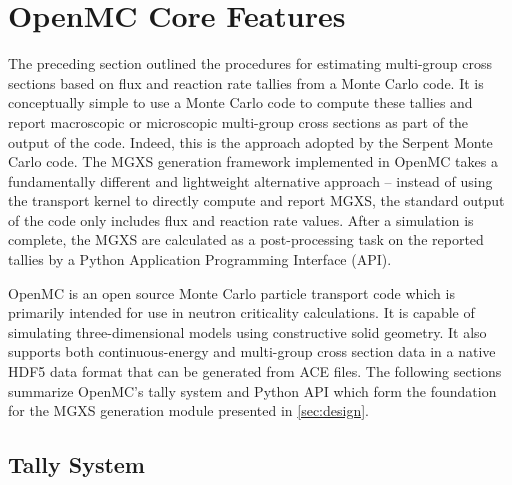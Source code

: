 \section{OpenMC Core Features}
\label{sec:openmc}

The preceding section outlined the procedures for estimating multi-group cross sections based on flux and reaction rate tallies from a Monte Carlo code. It is conceptually simple to use a Monte Carlo code to compute these tallies and report macroscopic or microscopic multi-group cross sections as part of the output of the code. Indeed, this is the approach adopted by the Serpent Monte Carlo code\cite{leppanen2016homog}. The MGXS generation framework implemented in OpenMC takes a fundamentally different and lightweight alternative approach -- instead of using the transport kernel to directly compute and report MGXS, the standard output of the code only includes flux and reaction rate values. After a simulation is complete, the MGXS are calculated as a post-processing task on the reported tallies by a Python Application Programming Interface (API).

OpenMC is an open source Monte Carlo particle transport code which is primarily intended for use in neutron criticality calculations. It is capable of simulating three-dimensional models using constructive solid geometry. It also supports both continuous-energy and multi-group cross section data in a native HDF5\cite{koranne2011hdf5} data format\cite{romano2017epjwoc} that can be generated from ACE files. The following sections summarize OpenMC's tally system and Python API which form the foundation for the MGXS generation module presented in \cref{sec:design}.

\subsection{Tally System}
\label{subsec:tallies}

